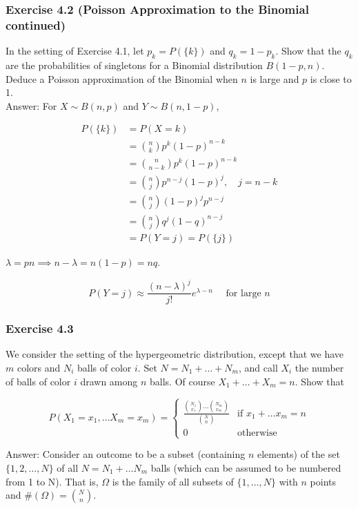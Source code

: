 \documentclass{article}
\begin{document}
{\subsubsection*{Exercise 4.2 (Poisson Approximation to the Binomial continued)}

In the setting of Exercise 4.1, let $p_k = P(\{k\})$ and $q_k = 1 - p_k$. Show that the $q_k$ are the
probabilities of singletons for a Binomial distribution $B(1 - p, n)$. Deduce a Poisson approximation of the Binomial when $n$ is large and $p$ is close to 1. \\

Answer: For $X \sim B(n,p)$ and $Y \sim B(n,1-p)$,

\begin{align*}
P(\{k\}) &= P(X = k)\\
&= \binom{n}{k} p^k(1-p)^{n-k} \\
&= \binom{n}{n-k} p^k(1-p)^{n-k} \\
&= \binom{n}{j} p^{n-j}(1-p)^{j}, \quad j = n-k \\
&= \binom{n}{j} (1-p)^{j}p^{n-j} \\
&= \binom{n}{j} q^j(1-q)^{n-j} \\
&= P(Y = j) = P(\{j\})
\end{align*}

$\lambda = pn \implies n-\lambda = n(1-p) = nq$. 

$$
P(Y = j) \approx \frac{(n-\lambda)^j}{j!}e^{\lambda - n} \quad \text{ for large } n
$$

\subsubsection*{Exercise 4.3}

We consider the setting of the hypergeometric distribution, except that we have $m$ colors and $N_i$ balls of color $i$. Set $N = N_1+\dots +N_m$, and call $X_i$ the
number of balls of color $i$ drawn among $n$ balls. Of course $X_1 + \dots +X_m = n$.
Show that

$$
P(X_1 = x_1, \dots X_m = x_m) = 
\begin{cases}
\frac{\binom{N_1}{x_1} \dots \binom{N_m}{x_m}}{\binom{N}{n}} & \text{if } x_1 + \dots x_m = n \\
0 & \text{otherwise}
\end{cases}
$$

Answer: Consider an outcome to be a subset (containing $n$ elements) of the set $\{1,2, \dots, N\}$ of all $N = N_1+\dots N_m$ balls (which can be assumed to be numbered from 1 to N). That is, $\Omega$ is the family of all subsets of $\{1,\dots, N\}$ with $n$ points and $\#(\Omega) = \binom{N}{n}$. \\

}
\end{document}
